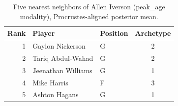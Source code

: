 \begin{table}[htbp]
  \centering\small
  \begin{tabular}{rllc}
    \toprule
    Rank & Player & Position & Archetype \\
    \midrule
    1 & Gaylon Nickerson & G & 2 \\
    2 & Tariq Abdul-Wahad & G & 2 \\
    3 & Jeenathan Williams & G & 1 \\
    4 & Mike Harris & F & 3 \\
    5 & Ashton Hagans & G & 1 \\
    \bottomrule
  \end{tabular}
  \caption{Five nearest neighbors of Allen Iverson (peak_age modality), Procrustes-aligned posterior mean.}
  \label{tab:Allen_Iverson_neighbors_peak_age}
\end{table}

